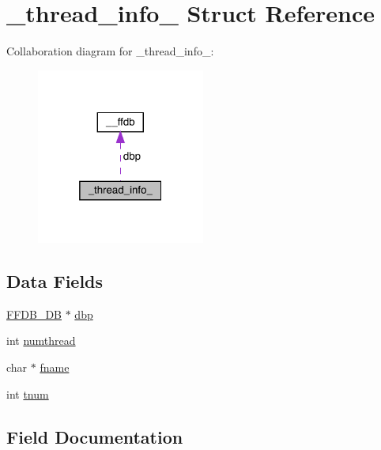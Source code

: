\hypertarget{struct__thread__info__}{}\section{\+\_\+thread\+\_\+info\+\_\+ Struct Reference}
\label{struct__thread__info__}


Collaboration diagram for \+\_\+thread\+\_\+info\+\_\+\+:\nopagebreak
\begin{figure}[H]
\begin{center}
\leavevmode
\includegraphics[width=157pt]{dd/d6a/struct__thread__info____coll__graph}
\end{center}
\end{figure}
\subsection*{Data Fields}
\begin{DoxyCompactItemize}
\item 
\mbox{\hyperlink{other__libs_2filedb_2filehash_2ffdb__db_8h_a0b27b956926453a7a8141ea8e10f0df8}{F\+F\+D\+B\+\_\+\+DB}} $\ast$ \mbox{\hyperlink{struct__thread__info___afd6492f9762eeb738c1037babbeab176}{dbp}}
\item 
int \mbox{\hyperlink{struct__thread__info___a5cdfeeb0597f6b8b0cc359894fbae6cc}{numthread}}
\item 
char $\ast$ \mbox{\hyperlink{struct__thread__info___ad5f4067013f0687bbe744ce75e31ecab}{fname}}
\item 
int \mbox{\hyperlink{struct__thread__info___a6a6d76906fe855601083b5ca283faf18}{tnum}}
\end{DoxyCompactItemize}


\subsection{Field Documentation}
\mbox{\label{struct__thread__info___afd6492f9762eeb738c1037babbeab176}} 
